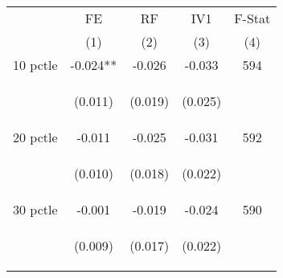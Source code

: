 \begin{tabular}{lcccc}


\toprule


\multicolumn{1}{l}{} & \multicolumn{1}{c}{FE} & \multicolumn{1}{c}{RF} & \multicolumn{1}{c}{IV1} & F-Stat  \\

 & (1) & (2) & (3) & (4)  \\ 
 

\hline


10 pctle   &  -0.024**    &    -0.026   &     -0.033  &  594 \\

\vspace{4pt} &  \begin{footnotesize}(0.011)\end{footnotesize}   &
			    \begin{footnotesize}(0.019)\end{footnotesize}   &
			    \begin{footnotesize}(0.025)\end{footnotesize}   &
			     \\          


20 pctle   &  -0.011    &    -0.025   &     -0.031  &  592  \\

\vspace{4pt} &  \begin{footnotesize}(0.010)\end{footnotesize}   &
			    \begin{footnotesize}(0.018)\end{footnotesize}   &
			    \begin{footnotesize}(0.022)\end{footnotesize}   &
			     \\          


30 pctle  &  -0.001    &    -0.019   &     -0.024  &  590  \\

\vspace{4pt} &  \begin{footnotesize}(0.009)\end{footnotesize}   &
			    \begin{footnotesize}(0.017)\end{footnotesize}   &
			    \begin{footnotesize}(0.022)\end{footnotesize}   &
			     \\          




\end{tabular}
